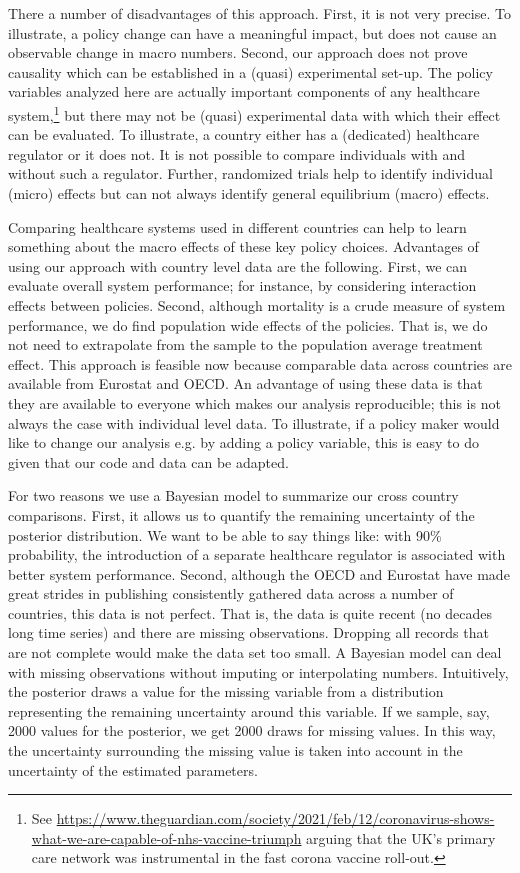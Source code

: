 \documentclass{article}
\begin{document}
There a number of disadvantages of this approach. First, it is not very precise. To illustrate, a policy change can have a meaningful impact, but does not cause an observable change in macro numbers. Second, our approach does not prove causality which can be established in a (quasi) experimental set-up. The policy variables analyzed here are actually important components of any healthcare system,\footnote{See \url{https://www.theguardian.com/society/2021/feb/12/coronavirus-shows-what-we-are-capable-of-nhs-vaccine-triumph} arguing that the UK's primary care network was instrumental in the fast corona vaccine roll-out.} but there may not be (quasi) experimental data with which their effect can be evaluated. To illustrate, a country either has a (dedicated) healthcare regulator or it does not. It is not possible to compare individuals with and without such a regulator. Further, randomized trials help to identify individual (micro) effects but can not always identify general equilibrium (macro) effects.

Comparing healthcare systems used in different countries can help to learn something about the macro effects of these key policy choices. Advantages of using our approach with country level data are the following. First, we can evaluate overall system performance; for instance, by considering interaction effects between policies. Second, although mortality is a crude measure of system performance, we do find population wide effects of the policies. That is, we do not need to extrapolate from the sample to the population average treatment effect. This approach is feasible now because comparable data across countries are available from Eurostat and OECD. An advantage of using these data is that they are available to everyone which makes our analysis reproducible; this is not always the case with individual level data. To illustrate, if a policy maker would like to change our analysis e.g. by adding a policy variable, this is easy to do given that our code and data can be adapted.

For two reasons we use a Bayesian model to summarize our cross country comparisons. First, it allows us to quantify the remaining uncertainty of the posterior distribution. We want to be able to say things like: with 90\% probability, the introduction of a separate healthcare regulator is associated with better system performance. Second, although the OECD and Eurostat have made great strides in publishing consistently gathered data across a number of countries, this data is not perfect. That is, the data is quite recent (no decades long time series) and there are missing observations. Dropping all records that are not complete would make the data set too  small. A Bayesian model can deal with missing observations without imputing or interpolating numbers. Intuitively, the posterior draws a value for the missing variable from a distribution representing the remaining uncertainty around this variable. If we sample, say, 2000 values for the posterior, we get 2000 draws for missing values. In this way, the uncertainty surrounding the missing value is taken into account in the uncertainty of the estimated parameters.
\end{document}
